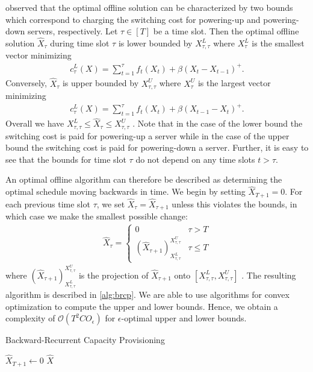 \citeauthor*{Lin2011} observed that the optimal offline solution can be characterized by two bounds which correspond to charging the switching cost for powering-up and powering-down servers, respectively. Let $\tau \in [T]$ be a time slot. Then the optimal offline solution $\hat{X}_{\tau}$ during time slot $\tau$ is lower bounded by $X_{\tau,\tau}^L$ where $X_{\tau}^L$ is the smallest vector minimizing \begin{align*}
    c_{\tau}^L(X) = \sum_{t=1}^{\tau} f_t(X_t) + \beta (X_t - X_{t-1})^+.
\end{align*} Conversely, $\hat{X}_{\tau}$ is upper bounded by $X_{\tau,\tau}^U$ where $X_{\tau}^U$ is the largest vector minimizing \begin{align*}
    c_{\tau}^L(X) = \sum_{t=1}^{\tau} f_t(X_t) + \beta (X_{t-1} - X_t)^+.
\end{align*} Overall we have $X_{\tau,\tau}^L \leq \hat{X}_{\tau} \leq X_{\tau,\tau}^U$ \cite{Lin2011}. Note that in the case of the lower bound the switching cost is paid for powering-up a server while in the case of the upper bound the switching cost is paid for powering-down a server. Further, it is easy to see that the bounds for time slot $\tau$ do not depend on any time slots $t > \tau$.

An optimal offline algorithm can therefore be described as determining the optimal schedule moving backwards in time. We begin by setting $\hat{X}_{T+1} = 0$. For each previous time slot $\tau$, we set $\hat{X}_{\tau} = \hat{X}_{\tau + 1}$ unless this violates the bounds, in which case we make the smallest possible change: \begin{align*}
    \hat{X}_{\tau} = \begin{cases}
        0 & \tau > T \\
        (\hat{X}_{\tau+1})_{X_{\tau,\tau}^L}^{X_{\tau,\tau}^U} & \tau \leq T
    \end{cases}
\end{align*} where $(\hat{X}_{\tau+1})_{X_{\tau,\tau}^L}^{X_{\tau,\tau}^U}$ is the projection of $\hat{X}_{\tau+1}$ onto $[X_{\tau,\tau}^L, X_{\tau,\tau}^U]$ \cite{Lin2011}. The resulting algorithm is described in \autoref{alg:brcp}. We are able to use algorithms for convex optimization to compute the upper and lower bounds. Hence, we obtain a complexity of $\mathcal{O}(T^2 C O_{\epsilon})$ for $\epsilon$-optimal upper and lower bounds.

\begin{algorithm}
    \caption{Backward-Recurrent Capacity Provisioning \cite{Lin2011}}\label{alg:brcp}
    $\hat{X}_{T+1} \gets 0$\;
    \Return $\hat{X}$\;
\end{algorithm}


